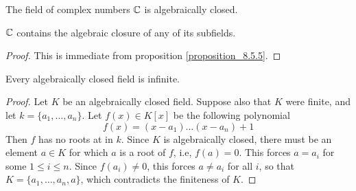 \begin{theorem}\label{theorem_8.5.7}
  The field of complex numbers $\mathbb{C}$ is algebraically closed.
\end{theorem}
\begin{corollary}
  $\mathbb{C}$ contains the algebraic closure of any of its subfields.
\end{corollary}
\begin{proof}
  This is immediate from proposition \ref{proposition_8.5.5}.
\end{proof}

\begin{proposition}\label{proposition_8.5.8}
  Every algebraically closed field is infinite.
\end{proposition}
\begin{proof}
  Let $K$ be an algebraically closed field. Suppose also that $K$ were finite,
  and let  $k=\{a_1, \dots, a_n\}$. Let $f(x) \in K[x]$ be the following
  polynomial
  \begin{equation*}
    f(x)=(x-a_1) \dots (x-a_n)+1
  \end{equation*}
  Then $f$ has no roots at in $k$. Since $K$ is algebraically closed,
  there must be an element $a \in K$ for which $a$ is a root of $f$, i.e,
  $f(a)=0$. This forces $a=a_i$  for some $1 \leq i \leq n$. Since
  $f(a_i) \neq 0$, this forces $a \neq a_i$ for all $i$, so that
  $K=\{a_1, \dots, a_n,a\}$, which contradicts the finiteness of $K$.
\end{proof}
